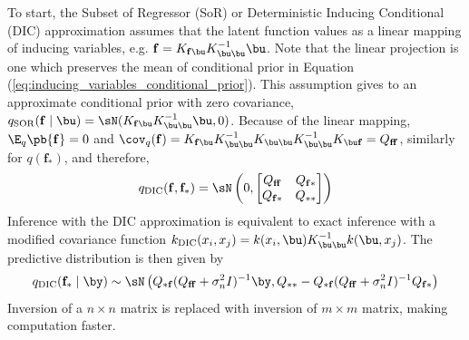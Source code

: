 \documentclass[11pt]{article}
\renewcommand\bf{\ensuremath{\mathbf{f}}}
\begin{document}
To start, the Subset of Regressor (SoR) or Deterministic Inducing Conditional (DIC) approximation assumes that the latent function values as a linear mapping of inducing variables, e.g. $\bf = K_{\bf\bu} K_{\bu\bu}^{-1} \bu$. Note that the linear projection is one which preserves the mean of conditional prior in Equation (\ref{eq:inducing_variables_conditional_prior}). This assumption gives to an approximate conditional prior with zero covariance, $q_{\text{SOR}}(\bf\mid\bu) = \sN(  K_{\bf\bu} K_{\bu\bu}^{-1} \bu, 0 )$. Because of the linear mapping, $\E_q\pb{\bf} = 0$ and $\cov_q(\bf) = K_{\bf\bu}K_{\bu\bu}^{-1} K_{\bu\bu} K_{\bu\bu}^{-1} K_{\bu\bf} = Q_{\bf\bf}$, similarly for $q(\bf_*)$, and therefore,
\begin{align}
    q_{\text{DIC}}(\bf,\bf_*)
        = \sN\left( 0,
            \begin{bmatrix}
                Q_{\bf\bf} & Q_{\bf*} \\
                Q_{\bf*} & Q_{**} \\ 
            \end{bmatrix}
        \right)
\end{align}
Inference with the DIC approximation is equivalent to exact inference with a modified covariance function $k_{\text{DIC}}(x_i,x_j) = k(x_i, \bu) K_{\bu\bu}^{-1} k(\bu, x_j)$. The predictive distribution is then given by 
\begin{align}
    q_{\text{DIC}}(\bf_*\mid \by)
        \sim \sN\left(
            Q_{*\bf} ( Q_{\bf\bf} + \sigma_n^2 I )^{-1} \by,
            Q_{**} - Q_{*\bf} ( Q_{\bf\bf} + \sigma_n^2 I )^{-1} Q_{\bf*}
        \right)
\end{align}
Inversion of a $n\times n$ matrix is replaced with inversion of $m\times m$ matrix, making computation faster. 
\end{document}
